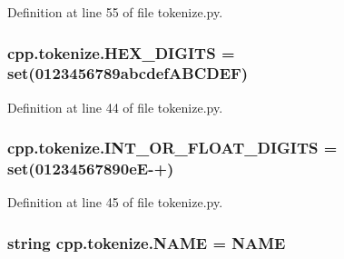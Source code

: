 Definition at line 55 of file tokenize.\+py.

\subsubsection[{\texorpdfstring{H\+E\+X\+\_\+\+D\+I\+G\+I\+TS}{HEX_DIGITS}}]{\setlength{\rightskip}{0pt plus 5cm}cpp.\+tokenize.\+H\+E\+X\+\_\+\+D\+I\+G\+I\+TS = set(\textquotesingle{}0123456789abcdef\+A\+B\+C\+D\+E\+F\textquotesingle{})}\hypertarget{namespacecpp_1_1tokenize_a8b45b0f0f2b504757e9ede9c342b2c36}{}\label{namespacecpp_1_1tokenize_a8b45b0f0f2b504757e9ede9c342b2c36}


Definition at line 44 of file tokenize.\+py.

\subsubsection[{\texorpdfstring{I\+N\+T\+\_\+\+O\+R\+\_\+\+F\+L\+O\+A\+T\+\_\+\+D\+I\+G\+I\+TS}{INT_OR_FLOAT_DIGITS}}]{\setlength{\rightskip}{0pt plus 5cm}cpp.\+tokenize.\+I\+N\+T\+\_\+\+O\+R\+\_\+\+F\+L\+O\+A\+T\+\_\+\+D\+I\+G\+I\+TS = set(\textquotesingle{}01234567890e\+E-\/+\textquotesingle{})}\hypertarget{namespacecpp_1_1tokenize_ad8c6dd06d4e6ef2e24e9186acb0aff43}{}\label{namespacecpp_1_1tokenize_ad8c6dd06d4e6ef2e24e9186acb0aff43}


Definition at line 45 of file tokenize.\+py.

\subsubsection[{\texorpdfstring{N\+A\+ME}{NAME}}]{\setlength{\rightskip}{0pt plus 5cm}string cpp.\+tokenize.\+N\+A\+ME = \textquotesingle{}N\+A\+ME\textquotesingle{}}\hypertarget{namespacecpp_1_1tokenize_aa14251ded979d72f93d7b234d8cfb584}{}\label{namespacecpp_1_1tokenize_aa14251ded979d72f93d7b234d8cfb584}


